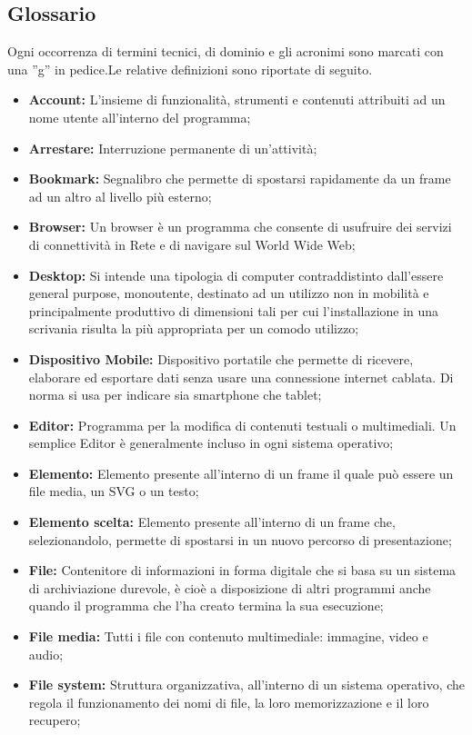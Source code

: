 \subsection{Glossario}
Ogni occorrenza di termini tecnici, di dominio e gli acronimi sono marcati con una ''g'' in pedice.Le relative definizioni sono riportate di seguito.
\begin{itemize}
\item \textbf{Account:} L'insieme di funzionalità, strumenti e contenuti attribuiti ad un nome utente all'interno del programma;
\item \textbf{Arrestare:} Interruzione permanente di un'attività;
\item \textbf{Bookmark:} Segnalibro che permette di spostarsi rapidamente da un frame ad un altro al livello più esterno;
\item \textbf{Browser:} Un browser è un programma che consente di usufruire dei servizi di connettività in Rete e di navigare sul World Wide Web;
\item \textbf{Desktop:} Si intende una tipologia di computer contraddistinto dall'essere general purpose, monoutente, destinato ad un utilizzo non in mobilità e principalmente produttivo di dimensioni tali per cui l'installazione in una scrivania risulta la più appropriata per un comodo utilizzo;
\item \textbf{Dispositivo Mobile:} Dispositivo portatile che permette di ricevere, elaborare ed esportare dati senza usare una connessione internet cablata. Di norma si usa per indicare sia smartphone che tablet;
\item \textbf{Editor:} Programma per la modifica di contenuti testuali o multimediali. Un semplice Editor è generalmente incluso in ogni sistema operativo;
\item \textbf{Elemento:} Elemento presente all'interno di un frame il quale può essere un file media, un SVG o un testo;
\item \textbf{Elemento scelta:} Elemento presente all'interno di un frame che, selezionandolo, permette di spostarsi in un nuovo percorso di presentazione;
\item \textbf{File:} Contenitore di informazioni in forma digitale che si basa su un sistema di archiviazione durevole, è cioè a disposizione di altri programmi anche quando il programma che l'ha creato termina la sua esecuzione;
\item \textbf{File media:} Tutti i file con contenuto multimediale: immagine, video e audio;
\item \textbf{File system:} Struttura organizzativa, all'interno di un sistema operativo, che regola il funzionamento dei nomi di file, la loro memorizzazione e il loro recupero;

\end{itemize}
